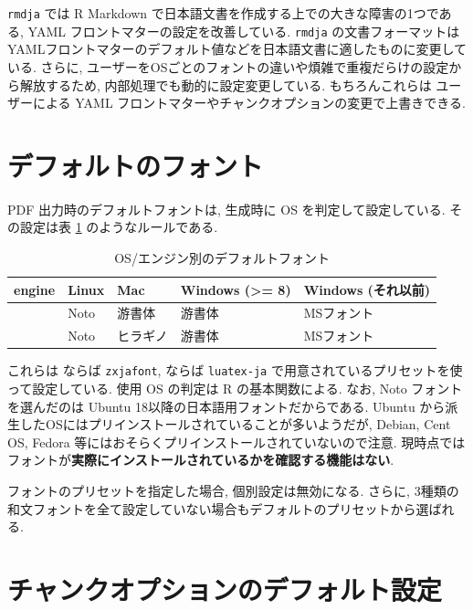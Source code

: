 \documentclass[
]{bxjsbook}
\theoremstyle{definition}
\theoremstyle{definition}
\theoremstyle{definition}
\theoremstyle{remark}
\begin{document}
\texttt{rmdja} では R Markdown
で日本語文書を作成する上での大きな障害の1つである, YAML
フロントマターの設定を改善している. \texttt{rmdja}
の文書フォーマットはYAMLフロントマターのデフォルト値などを日本語文書に適したものに変更している.
さらに,
ユーザーをOSごとのフォントの違いや煩雑で重複だらけの設定から解放するため,
内部処理でも動的に設定変更している. もちろんこれらは ユーザーによる YAML
フロントマターやチャンクオプションの変更で上書きできる.

\hypertarget{ux30c7ux30d5ux30a9ux30ebux30c8ux306eux30d5ux30a9ux30f3ux30c8}{%
\section{デフォルトのフォント}\label{ux30c7ux30d5ux30a9ux30ebux30c8ux306eux30d5ux30a9ux30f3ux30c8}}

PDF 出力時のデフォルトフォントは, 生成時に OS を判定して設定している.
その設定は表 \ref{tab:font-default} のようなルールである.

\begin{table}[!h]

\caption{\label{tab:font-default}OS/エンジン別のデフォルトフォント}
\centering
\begin{tabular}[t]{>{}lllll}
\toprule
engine & Linux & Mac & Windows (>= 8) & Windows (それ以前)\\
\midrule
\cellcolor{gray}{XeLaTeX} & Noto & 游書体 & 游書体 & MSフォント\\
\cellcolor{gray}{LuaLaTeX} & Noto & ヒラギノ & 游書体 & MSフォント\\
\bottomrule
\end{tabular}
\end{table}

これらは \XeLaTeX ならば \texttt{zxjafont}, \LuaLaTeX ならば
\texttt{luatex-ja} で用意されているプリセットを使って設定している. 使用
OS の判定は R の基本関数による. なお, Noto フォントを選んだのは Ubuntu
18以降の日本語用フォントだからである. Ubuntu
から派生したOSにはプリインストールされていることが多いようだが, Debian,
Cent OS, Fedora 等にはおそらくプリインストールされていないので注意.
現時点ではフォントが\textbf{実際にインストールされているかを確認する機能はない}.

フォントのプリセットを指定した場合, 個別設定は無効になる. さらに,
3種類の和文フォントを全て設定していない場合もデフォルトのプリセットから選ばれる.

\hypertarget{ux30c1ux30e3ux30f3ux30afux30aaux30d7ux30b7ux30e7ux30f3ux306eux30c7ux30d5ux30a9ux30ebux30c8ux8a2dux5b9a}{%
\section{チャンクオプションのデフォルト設定}\label{ux30c1ux30e3ux30f3ux30afux30aaux30d7ux30b7ux30e7ux30f3ux306eux30c7ux30d5ux30a9ux30ebux30c8ux8a2dux5b9a}}
\end{document}
